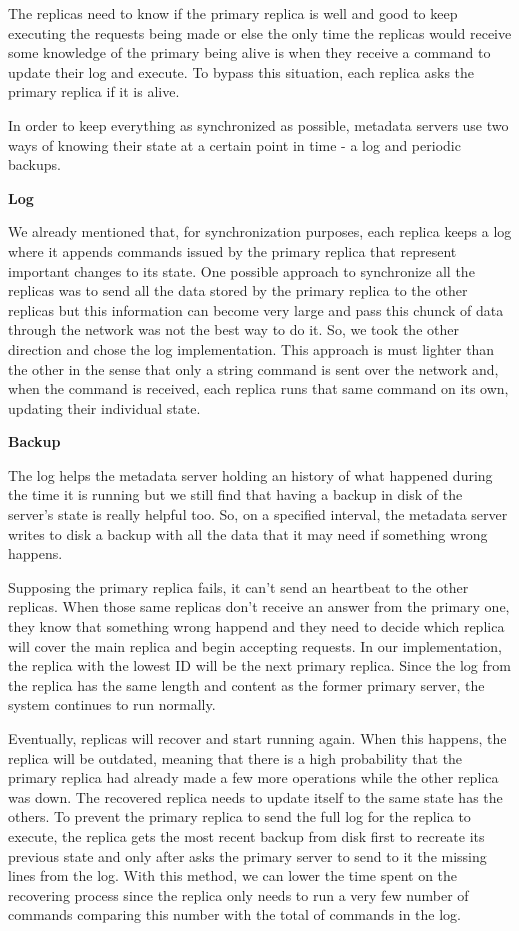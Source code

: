 The replicas need to know if the primary replica is well and good to keep
executing the requests being made or else the only time the replicas would
receive some knowledge of the primary being alive is when they receive a
command to update their log and execute. To bypass this situation, each
replica asks the primary replica if it is alive.

In order to keep everything as synchronized as possible, metadata servers use two
ways of knowing their state at a certain point in time - a log and periodic backups.

\bigskip
\textbf{Log}
\smallskip

We already mentioned that, for synchronization purposes, each replica keeps a log
where it appends commands issued by the primary replica that represent important
changes to its state. One possible approach to synchronize all the replicas was to
send all the data stored by the primary replica to the other replicas but this
information can become very large and pass this chunck of data through the network
was not the best way to do it. So, we took the other direction and chose the log
implementation. This approach is must lighter than the other in the sense that only
a string command is sent over the network and, when the command is received, each
replica runs that same command on its own, updating their individual state.

\bigskip
\textbf{Backup}
\smallskip

The log helps the metadata server holding an history of what happened during the time
it is running but we still find that having a backup in disk of the server's state is really
helpful too. So, on a specified interval, the metadata server writes to disk a backup with
all the data that it may need if something wrong happens.

\bigskip

Supposing the primary replica fails, it can't send an heartbeat to the other replicas. When
those same replicas don't receive an answer from the primary one, they know that something
wrong happend and they need to decide which replica will cover the main replica and
begin accepting requests. In our implementation, the replica with the lowest ID will be
the next primary replica. Since the log from the replica has the same length and content as
the former primary server, the system continues to run normally.

\medskip

Eventually, replicas will recover and start running again. When this happens, the replica
will be outdated, meaning that there is a high probability that the primary replica had
already made a few more operations while the other replica was down. The recovered
replica needs to update itself to the same state has the others. To prevent the primary
replica to send the full log for the replica to execute, the replica gets the most recent
backup from disk first to recreate its previous state and only after asks the primary
server to send to it the missing lines from the log. With this method, we can lower the
time spent on the recovering process since the replica only needs to run a very few
number of commands comparing this number with the total of commands in the log.